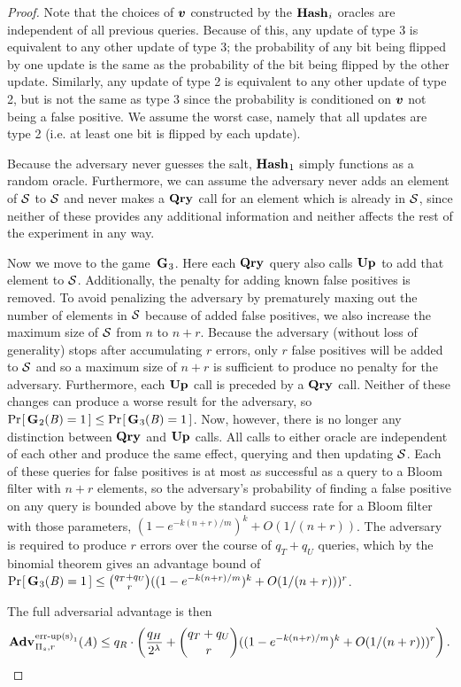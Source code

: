 \begin{proof}
Note that the choices of $\vv$ constructed by the $\mathbf{Hash}\hspace{0.5pt}_i$ oracles are independent of all previous queries. Because of this, any update of type 3 is equivalent to any other update of type 3; the probability of any bit being flipped by one update is the same as the probability of the bit being flipped by the other update. Similarly, any update of type 2 is equivalent to any other update of type 2, but is not the same as type 3 since the probability is conditioned on $\vv$ not being a false positive. We assume the worst case, namely that all updates are type 2 (i.e. at least one bit is flipped by each update).

Because the adversary never guesses the salt, $\mathbf{Hash}\hspace{0.5pt}_1$ simply functions as a random oracle. Furthermore, we can assume the adversary never adds an element of $\mathcal{S}$ to $\mathcal{S}$ and never makes a $\mathbf{Qry}\hspace{0.5pt}$ call for an element which is already in $\mathcal{S}$, since neither of these provides any additional information and neither affects the rest of the experiment in any way.

Now we move to the game~$\mathbf{G}\hspace{0.5pt}_3$. Here each $\mathbf{Qry}\hspace{0.5pt}$ query also calls $\mathbf{Up}\hspace{0.5pt}$ to add that element to $\mathcal{S}$. Additionally, the penalty for adding known false positives is removed. To avoid penalizing the adversary by prematurely maxing out the number of elements in $\mathcal{S}$ because of added false positives, we also increase the maximum size of $\mathcal{S}$ from $n$ to $n+r$. Because the adversary (without loss of generality) stops after accumulating $r$ errors, only $r$ false positives will be added to $\mathcal{S}$ and so a maximum size of $n+r$ is sufficient to produce no penalty for the adversary. Furthermore, each $\mathbf{Up}\hspace{0.5pt}$ call is preceded by a $\mathbf{Qry}\hspace{0.5pt}$ call. Neither of these changes can produce a worse result for the adversary, so $\Pr\hspace{-1pt}\left[\,\mathbf{G}\hspace{0.5pt}_2(\mathit{B}) = 1\,\right] \le \Pr\hspace{-1pt}\left[\,\mathbf{G}\hspace{0.5pt}_3(\mathit{B}) = 1\,\right]$. Now, however, there is no longer any distinction between $\mathbf{Qry}\hspace{0.5pt}$ and $\mathbf{Up}\hspace{0.5pt}$ calls. All calls to either oracle are independent of each other and produce the same effect, querying and then updating $\mathcal{S}$. Each of these queries for false positives is at most as successful as a query to a Bloom filter with $n+r$ elements, so the adversary's probability of finding a false positive on any query is bounded above by the standard success rate for a Bloom filter with those parameters, $(1-e^{-k(n+r)/m})^k+O(1/(n+r))$. The adversary is required to produce $r$ errors over the course of $q_T+q_U$ queries, which by the binomial theorem gives an advantage bound of $\Pr\hspace{-1pt}\left[\,\mathbf{G}\hspace{0.5pt}_3(\mathit{B}) = 1\,\right] \le \binom{q_T+q_U}{r}((1-e^{-k(n+r)/m})^k+O(1/(n+r)))^r$.

The full adversarial advantage is then
$$\Adv{\erreps_1}_{\struct_s,r}(\advA) \le q_R \cdot \left(\frac{q_H}{2^\lambda} + \binom{q_T+q_U}{r}((1-e^{-k(n+r)/m})^k+O(1/(n+r)))^r\right).$$
\missingqed
\end{proof}

